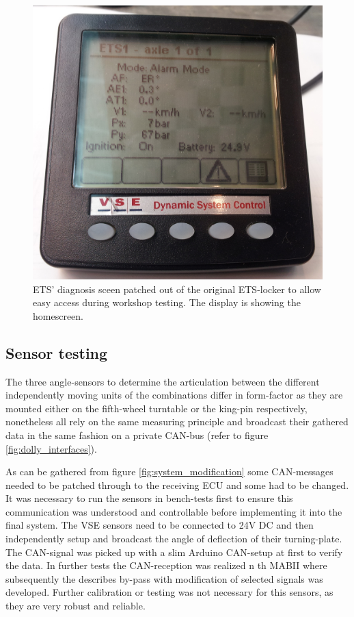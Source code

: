 \documentclass[ExampleMasters.tex]{subfiles}
\begin{document}
\begin{figure}[h]
\centering
\includegraphics[width=0.6\linewidth]{figures/ETS_display_homescreen}
\caption[\acrshort{ETS}' diagnosis sceen patched out of the original \acrshort{ETS}-locker to allow easy access during workshop testing. The display is showing the homescreen.]{\gls{ETS}' diagnosis sceen patched out of the original \gls{ETS}-locker to allow easy access during workshop testing. The display is showing the homescreen.}
\label{fig:ETS_display_homescreen}
\end{figure}


\subsection{Sensor testing}

The three angle-sensors to determine the articulation between the different independently moving units of the combinations differ in form-factor as they are mounted either on the fifth-wheel turntable or the king-pin respectively, nonetheless all rely on the same measuring principle and broadcast their gathered data in the same fashion on a private \gls{CAN}-bus (refer to figure \ref{fig:dolly_interfaces}). 

As can be gathered from figure \ref{fig:system_modification} some CAN-messages needed to be patched through to the receiving \gls{ECU} and some had to be changed. It was necessary to run the sensors in bench-tests first to ensure this communication was understood and controllable before implementing it into the final system. The \gls{VSE} sensors need to be connected to 24V \gls{DC} and then independently setup and broadcast the angle of deflection of their turning-plate. The CAN-signal was picked up with a slim Arduino CAN-setup at first to verify the data. In further tests the \gls{CAN}-reception was realized n th \gls{MABII} where subsequently the describes by-pass with modification of selected signals was developed.%
Further calibration or testing was not necessary for this sensors, as they are very robust and reliable. 
\end{document}

